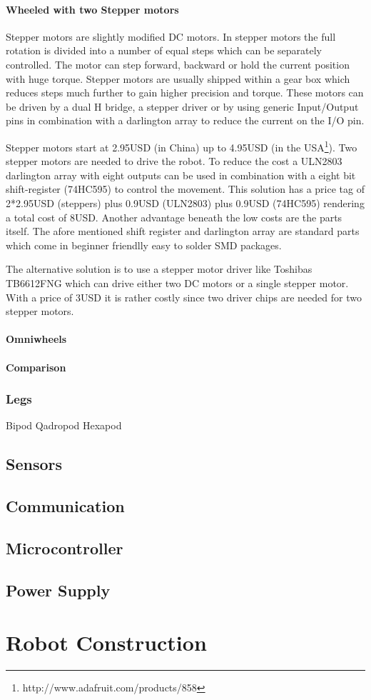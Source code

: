 \documentclass[twocolumn]{article}
\begin{document}
\paragraph{Wheeled with two Stepper motors}
Stepper motors are slightly modified DC motors. In stepper motors the full rotation is divided into a number of equal steps which can be separately controlled. The motor can step forward, backward or hold the current position with huge torque. Stepper motors are usually shipped within a gear box which reduces steps much further to gain higher precision and torque. 
These motors can be driven by a dual H bridge, a stepper driver or by using generic Input/Output pins in combination with a darlington array to reduce the current on the I/O pin. 

Stepper motors start at 2.95USD (in China) up to 4.95USD (in the USA\footnote{http://www.adafruit.com/products/858}). Two stepper motors are needed to drive the robot. To reduce the cost a ULN2803 darlington array with eight outputs can be used in combination with a eight bit shift-register (74HC595) to control the movement. This solution has a price tag of 2*2.95USD (steppers) plus 0.9USD (ULN2803) plus 0.9USD (74HC595) rendering a total cost of 8USD. Another advantage beneath the low costs are the parts itself. The afore mentioned shift register and darlington array are standard parts which come in beginner friendlly easy to solder SMD packages. 

The alternative solution is to use a stepper motor driver like Toshibas TB6612FNG which can drive either two DC motors or a single stepper motor. With a price of 3USD it is rather costly since two driver chips are needed for two stepper motors.

\paragraph{Omniwheels}

\paragraph{Comparison}


\subsubsection{Legs}
Bipod
Qadropod
Hexapod

\subsection{Sensors}
\subsection{Communication}
\subsection{Microcontroller}
\subsection{Power Supply}

\section{Robot Construction}



\nocite{*}
\printbibliography
{}
\end{document}
